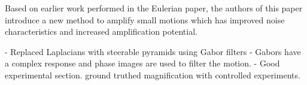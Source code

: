 \documentclass{article}
\begin{document}
Based on earlier work performed in the Eulerian paper, the authors of this paper introduce a new method to amplify small motions which has improved noise characteristics and increased amplification potential.

- Replaced Laplacians with steerable pyramids using Gabor filters
- Gabors have a complex response and phase images are used to filter the motion.
- Good experimental section. ground truthed magnification with controlled experiments.
\end{document}
